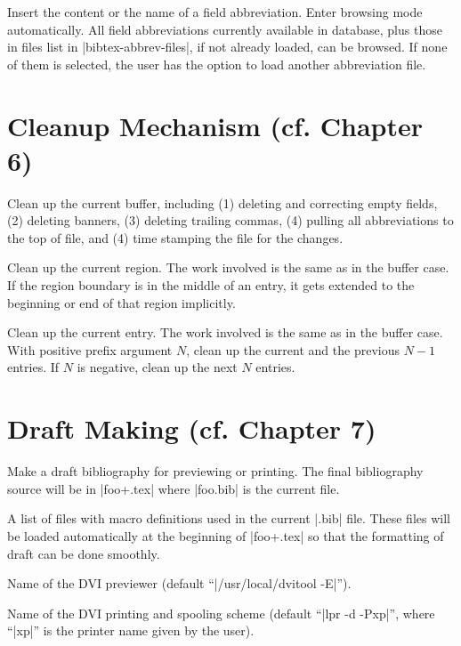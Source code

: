 Insert the content or the name of a field abbreviation.
Enter browsing mode automatically.
All field abbreviations currently available in database,
plus those in files list in |bibtex-abbrev-files|, if not already loaded,
can be browsed.  If none of them is selected, the user has the option to load
another abbreviation file.


\section{Cleanup Mechanism (cf. Chapter 6)}

Clean up the current buffer, including (1) deleting and correcting empty
fields, (2) deleting banners, (3) deleting trailing commas, 
(4) pulling all abbreviations to the top of file, and (4) time stamping
the file for the changes.

Clean up the current region.  The work involved is the same as in the
buffer case.  If the region boundary is in the middle of 
an entry, it gets extended to the beginning or end of that region implicitly.

Clean up the current entry.  The work involved is the same as in the
buffer case.  With positive prefix argument $N$, clean up the current and the
previous $N-1$ entries.  If $N$ is negative, clean up the next $N$ entries.


\section{Draft Making (cf. Chapter 7)}

Make a draft bibliography for previewing or printing.
The final bibliography source will be in |foo+.tex| where
|foo.bib| is the current file.

A list of files with macro definitions used in the current |.bib| file.
These files will be loaded automatically at the beginning of |foo+.tex|
so that the formatting of draft can be done smoothly.

Name of the DVI previewer (default ``|/usr/local/dvitool -E|'').

Name of the DVI printing and spooling scheme
(default ``|lpr -d -Pxp|'', where ``|xp|'' is the printer name given
by the user).

